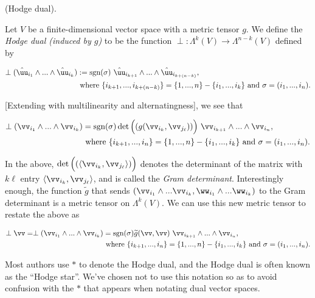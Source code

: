 \begin{defn}
    (Hodge dual).
    
    Let $V$ be a finite-dimensional vector space with a metric tensor $g$. We define the \textit{Hodge dual (induced by $g$)} to be the function $\perp:\Lambda^k(V) \rightarrow \Lambda^{n - k}(V)$ defined by
    
    \begin{align*}
        \perp(\huu_{i_1} \wedge ... \wedge \huu_{i_k}) &:= \sgn(\sigma) \spc \huu_{i_{k + 1}} \wedge ... \wedge \huu_{i_{k + (n - k)}}, \\ &\text{ where } \{i_{k + 1}, ..., i_{k + (n - k)} \} = \{1, ..., n\} - \{i_1, ..., i_k\} \text{ and } \sigma = (i_1, ..., i_n).
    \end{align*}
    
    [Extending with multilinearity and alternatingness], we see that
    
    \begin{align*}
        \perp(\vv_{i_1} \wedge ... \wedge \vv_{i_k}) &= \sgn(\sigma) \det\Big((g(\vv_{i_k}, \vv_{j_\ell}))\Big) \spc \vv_{i_{k + 1}} \wedge ... \wedge \vv_{i_n}, \\ &\text{ where } \{i_{k + 1}, ..., i_n\} = \{1, ..., n\} - \{i_1, ..., i_k\} \text{ and } \sigma = (i_1, ..., i_n).
    \end{align*}
    
    In the above, $\det \Big( (\langle \vv_{i_k}, \vv_{j_\ell} \rangle) \Big)$ denotes the determinant of the matrix with $k\ell$ entry $\langle \vv_{i_k}, \vv_{j_\ell} \rangle$, and is called the \textit{Gram determinant}. Interestingly enough, the function $\widetilde{g}$ that sends $(\vv_{i_1} \wedge ... \vv_{i_k}, \ww_{i_1} \wedge ... \ww_{i_k})$ to the Gram determinant is a metric tensor on $\Lambda^k(V)$. We can use this new metric tensor to restate the above as
    
    \begin{align*}
        \perp \vv = \perp(\vv_{i_1} \wedge ... \wedge \vv_{i_k}) &= \sgn(\sigma) \widetilde{g}(\vv, \vv) \spc \vv_{i_{k + 1}} \wedge ... \wedge \vv_{i_n}, \\ &\text{ where } \{i_{k + 1}, ..., i_n\} = \{1, ..., n\} - \{i_1, ..., i_k\} \text{ and } \sigma = (i_1, ..., i_n).
    \end{align*}
    
    Most authors use $*$ to denote the Hodge dual, and the Hodge dual is often known as the ``Hodge star''. We've chosen not to use this notation so as to avoid confusion with the $*$ that appears when notating dual vector spaces.
\end{defn}

